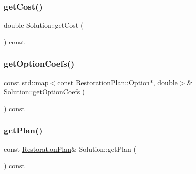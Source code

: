 \mbox{\label{class_solution_ad4f76bea091ec66302df270168e68feb}} 
\subsubsection{\texorpdfstring{get\+Cost()}{getCost()}}
{\footnotesize\ttfamily double Solution\+::get\+Cost (\begin{DoxyParamCaption}{ }\end{DoxyParamCaption}) const\hspace{0.3cm}{\ttfamily [inline]}}

\mbox{\label{class_solution_a4b97ae617451a4e255179ac1e80eb45e}} 
\subsubsection{\texorpdfstring{get\+Option\+Coefs()}{getOptionCoefs()}}
{\footnotesize\ttfamily const std\+::map$<$const \hyperlink{class_restoration_plan_1_1_option}{Restoration\+Plan\+::\+Option}$\ast$, double$>$\& Solution\+::get\+Option\+Coefs (\begin{DoxyParamCaption}{ }\end{DoxyParamCaption}) const\hspace{0.3cm}{\ttfamily [inline]}}

\mbox{\label{class_solution_a95446a3f6110054a0085a22bee9ce64e}} 
\subsubsection{\texorpdfstring{get\+Plan()}{getPlan()}}
{\footnotesize\ttfamily const \hyperlink{class_restoration_plan}{Restoration\+Plan}\& Solution\+::get\+Plan (\begin{DoxyParamCaption}{ }\end{DoxyParamCaption}) const\hspace{0.3cm}{\ttfamily [inline]}}

\mbox{\label{class_solution_a4388ef028db3bc8e6fd6a6be0478cedc}} 
